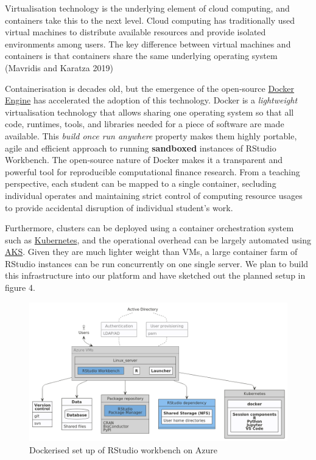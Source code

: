 \documentclass{article}
\begin{document}
Virtualisation technology is the underlying element of cloud computing,
and containers take this to the next level. Cloud computing has
traditionally used virtual machines to distribute available resources
and provide isolated environments among users. The key difference
between virtual machines and containers is that containers share the
same underlying operating system (Mavridis and Karatza 2019)

Containerisation is decades old, but the emergence of the open-source
\href{https://www.ibm.com/cloud/learn/docker}{Docker Engine} has
accelerated the adoption of this technology. Docker is a
\emph{lightweight} virtualisation technology that allows sharing one
operating system so that all code, runtimes, tools, and libraries needed
for a piece of software are made available. This \emph{build once run
anywhere} property makes them highly portable, agile and efficient
approach to running \textbf{sandboxed} instances of RStudio Workbench.
The open-source nature of Docker makes it a transparent and powerful
tool for reproducible computational finance research. From a teaching
perspective, each student can be mapped to a single container, secluding
individual operates and maintaining strict control of computing resource
usages to provide accidental disruption of individual student's work.

Furthermore, clusters can be deployed using a container orchestration
system such as
\href{https://www.ibm.com/cloud/learn/kubernetes}{Kubernetes}, and the
operational overhead can be largely automated using
\href{https://docs.microsoft.com/en-us/azure/aks/intro-kubernetes}{AKS}.
Given they are much lighter weight than VMs, a large container farm of
RStudio instances can be run concurrently on one single server. We plan
to build this infrastructure into our platform and have sketched out the
planned setup in figure 4.

\begin{figure}

{\centering \includegraphics[width=0.8\linewidth]{img/rstudiowb_kb} 

}

\caption{Dockerised set up of RStudio workbench on Azure}\label{fig:future-setup}
\end{figure}
\end{document}
